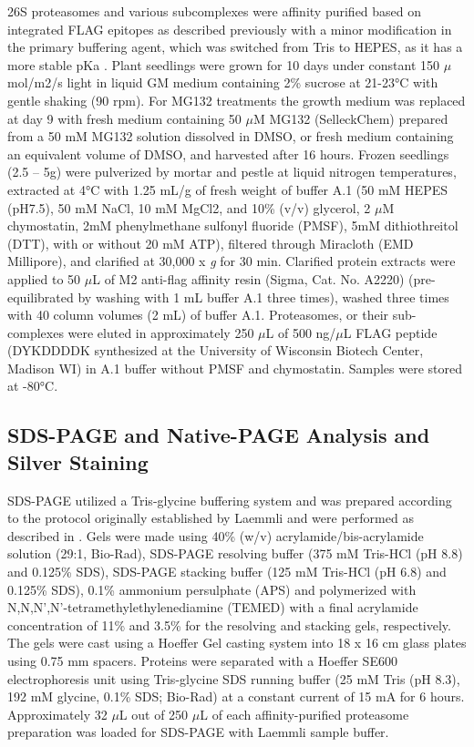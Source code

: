 	26S proteasomes and various subcomplexes were affinity purified based on integrated FLAG epitopes as described previously with a minor modification in the primary buffering agent, which was switched from Tris to HEPES, as it has a more stable pKa \citep{book10, marshall17}. Plant seedlings were grown for 10 days under constant 150 $\mu$mol/m2/s light in liquid GM medium containing 2\% sucrose at 21-23°C with gentle shaking (90 rpm). For MG132 treatments the growth medium was replaced at day 9 with fresh medium containing 50 $\mu$M MG132 (SelleckChem) prepared from a 50 mM MG132 solution dissolved in DMSO, or fresh medium containing an equivalent volume of DMSO, and harvested after 16 hours. Frozen seedlings (2.5 – 5g) were pulverized by mortar and pestle at liquid nitrogen temperatures, extracted at 4°C with 1.25 mL/g of fresh weight of buffer A.1 (50 mM HEPES (pH7.5), 50 mM NaCl, 10 mM MgCl2, and 10\%  (v/v) glycerol, 2 $\mu$M chymostatin, 2mM phenylmethane sulfonyl fluoride (PMSF), 5mM dithiothreitol (DTT), with or without 20 mM ATP), filtered through Miracloth (EMD Millipore), and clarified at 30,000 x \textit{g} for 30 min. Clarified protein extracts were applied to 50 $\mu$L of M2 anti-flag affinity resin (Sigma, Cat. No. A2220) (pre-equilibrated by washing with 1 mL buffer A.1 three times), washed three times with 40 column volumes (2 mL) of buffer A.1. Proteasomes, or their sub-complexes were eluted in approximately 250 $\mu$L of 500 ng/$\mu$L FLAG peptide (DYKDDDDK synthesized at the University of Wisconsin Biotech Center, Madison WI) in A.1 buffer without PMSF and chymostatin. Samples were stored at -80°C.

\subsection{SDS-PAGE and Native-PAGE Analysis and Silver Staining}
	SDS-PAGE utilized a Tris-glycine buffering system and was prepared according to the protocol originally established by Laemmli \citep{laemmli70} and were performed as described in \citep{marshall17}. Gels were made using 40\% (w/v) acrylamide/bis-acrylamide solution (29:1, Bio-Rad), SDS-PAGE resolving buffer (375 mM Tris-HCl (pH 8.8) and 0.125\% SDS), SDS-PAGE stacking buffer (125 mM Tris-HCl (pH 6.8) and 0.125\% SDS), 0.1\% ammonium persulphate (APS) and polymerized with N,N,N’,N’-tetramethylethylenediamine (TEMED) with a final acrylamide concentration of 11\% and 3.5\% for the resolving and stacking gels, respectively. The gels were cast using a Hoeffer Gel casting system into 18 x 16 cm glass plates using 0.75 mm spacers. Proteins were separated with a Hoeffer SE600 electrophoresis unit using Tris-glycine SDS running buffer (25 mM Tris (pH 8.3), 192 mM glycine, 0.1\% SDS; Bio-Rad) at a constant current of 15 mA for 6 hours. Approximately 32 $\mu$L out of 250 $\mu$L of each affinity-purified proteasome preparation was loaded for SDS-PAGE with Laemmli sample buffer. 
		 
